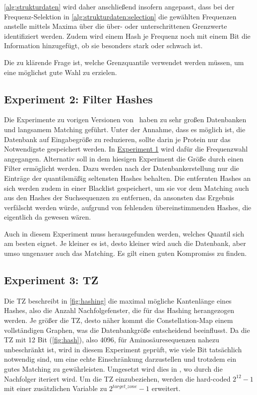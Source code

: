         \autoref{alg:strukturdaten} wird daher anschließend insofern angepasst, dass bei der Frequenz-Selektion in \autoref{alg:strukturdaten:selection} die gewählten Frequenzen anstelle mittels Maxima über die über- oder unterschrittenen Grenzwerte identifiziert werden. Zudem wird einem Hash je Frequenz noch mit einem Bit die Information hinzugefügt, ob sie besonders stark oder schwach ist.

        Die zu klärende Frage ist, welche Grenzquantile verwendet werden müssen, um eine möglichst gute Wahl zu erzielen.
    \subsection{Experiment 2: Filter Hashes} %
        \label{exp:filter_hashes}
        Die Experimente zu vorigen Versionen von \protfin\ haben zu sehr großen Datenbanken und langsamem Matching geführt. Unter der Annahme, dass es möglich ist, die Datenbank auf Eingabegröße zu reduzieren, sollte darin je Protein nur das Notwendigste gespeichert werden. In \hyperref[exp:uniref90]{Experiment 1} wird dafür die Frequenzwahl angegangen. Alternativ soll in dem hiesigen Experiment die Größe durch einen Filter ermöglicht werden. Dazu werden nach der Datenbankerstellung nur die Einträge der quantilsmäßig seltensten Hashes behalten. Die entfernten Hashes an sich werden zudem in einer Blacklist gespeichert, um sie vor dem Matching auch aus den Hashes der Suchsequenzen zu entfernen, da ansonsten das Ergebnis verfälscht werden würde, aufgrund von fehlenden übereinstimmenden Hashes, die eigentlich da gewesen wären.

        Auch in diesem Experiment muss herausgefunden werden, welches Quantil sich am besten eignet. Je kleiner es ist, desto kleiner wird auch die Datenbank, aber umso ungenauer auch das Matching. Es gilt einen guten Kompromiss zu finden.
    \subsection{Experiment 3: \acl{TZ}} %
        \label{exp:target_zone}
        Die \ac{TZ} beschreibt in \autoref{fig:hashing} die maximal mögliche Kantenlänge eines Hashes, also die Anzahl Nachfolgefenster, die für das Hashing herangezogen werden. Je größer die \ac{TZ}, desto näher kommt die Constellation-Map einem vollständigen Graphen, was die Datenbankgröße entscheidend beeinflusst. Da die \ac{TZ} mit 12 Bit (\autoref{fig:hash}), also 4096, für Aminosäuresequenzen nahezu unbeschränkt ist, wird in diesem Experiment geprüft, wie viele Bit tatsächlich notwendig sind, um eine echte Einschränkung darzustellen und trotzdem ein gutes Matching zu gewährleisten. Umgesetzt wird dies in , wo durch die Nachfolger iteriert wird. Um die \ac{TZ} einzubeziehen, werden die hard-coded $2^{12} - 1$ mit einer zusätzlichen Variable zu $2^{target\_zone} - 1$ erweitert.
